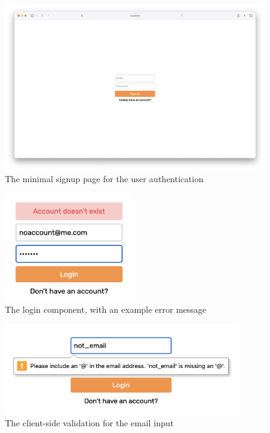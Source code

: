 \begin{figure}[H]
	\centering
	\includegraphics[width=\textwidth]{images/Signup_page.png}
	\caption{The minimal signup page for the user authentication}
	\label{fig:Signup_page}
\end{figure}

\begin{figure}[H]
	\centering
	\includegraphics[width=0.5\textwidth]{images/Noaccount.png}
	\caption{The login component, with an example error message}
	\label{fig:Login_component}
\end{figure}

\begin{figure}[H]
	\centering
	\includegraphics[width=0.9\textwidth]{images/email_validation.png}
	\caption{The client-side validation for the email input}
	\label{fig:Email_validation}
\end{figure}


